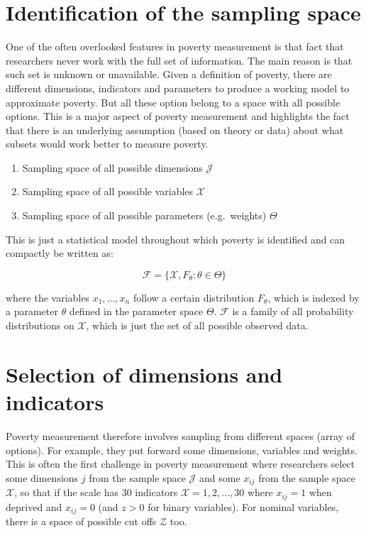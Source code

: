 \documentclass[]{book}
\providecommand{\tightlist}{%
  \setlength{\itemsep}{0pt}\setlength{\parskip}{0pt}}
\begin{document}
\hypertarget{samplingspace}{%
\section{Identification of the sampling space}\label{samplingspace}}

One of the often overlooked features in poverty measurement is that fact that researchers never work with the full set of information. The main reason is that such set is unknown or unavailable. Given a definition of poverty, there are different dimensions, indicators and parameters to produce a working model to approximate poverty. But all these option belong to a space with all possible options. This is a major aspect of poverty measurement and highlights the fact that there is an underlying assumption (based on theory or data) about what subsets would work better to measure poverty.

\begin{enumerate}
\def\labelenumi{\arabic{enumi}.}
\tightlist
\item
  Sampling space of all possible dimensions \(\mathscr J\)
\item
  Sampling space of all possible variables \(\mathscr X\)
\item
  Sampling space of all possible parameters (e.g.~weights) \(\Theta\)
\end{enumerate}

This is just a statistical model throughout which poverty is identified and can compactly be written as:

\begin{equation}
\mathscr F = \{\mathscr X, F_{\theta} : \theta \in \Theta\}
\end{equation}

where the variables \(x_1,...,x_n\) follow a certain distribution \(F_{\theta}\), which is indexed by a parameter \(\theta\) defined in the parameter space \(\Theta\). \(\mathscr F\) is a family of all probability distributions on \(\mathscr X\), which is just the set of all possible observed data.

\hypertarget{selection-of-dimensions-and-indicators}{%
\section{Selection of dimensions and indicators}\label{selection-of-dimensions-and-indicators}}

Poverty measurement therefore involves sampling from different spaces (array of options). For example, they put forward some dimensions, variables and weights. This is often the first challenge in poverty measurement where researchers select some dimensions \(j\) from the sample space \(\mathscr J\) and some \(x_{ij}\) from the sample space \(\mathscr X\), so that if the scale has 30 indicators \(\mathscr X={1,2,...,30}\) where \(x_{ij}=1\) when deprived and \(x_{ij}=0\) (and \(z>0\) for binary variables). For nominal variables, there is a space of possible cut offs \(\mathscr Z\) too.
\end{document}
